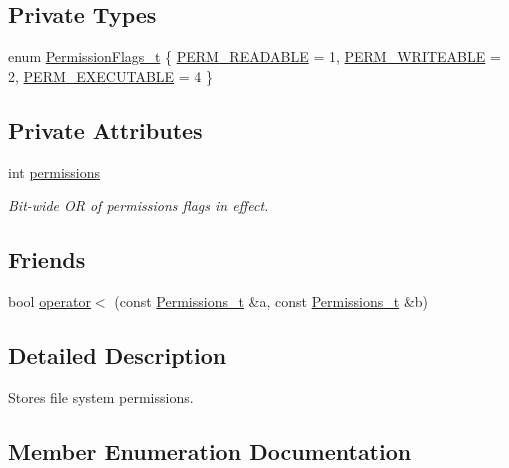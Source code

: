 \subsection*{Private Types}
\begin{DoxyCompactItemize}
\item 
enum \hyperlink{structmodel_1_1_permissions__t_ab1c91c7f3d56dced962efd5095d6bd49}{Permission\+Flags\+\_\+t} \{ \hyperlink{structmodel_1_1_permissions__t_ab1c91c7f3d56dced962efd5095d6bd49adae172fe253bba2932c2972b03c0bb81}{P\+E\+R\+M\+\_\+\+R\+E\+A\+D\+A\+B\+LE} = 1, 
\hyperlink{structmodel_1_1_permissions__t_ab1c91c7f3d56dced962efd5095d6bd49a2d1f75751b928036a9c12346d3b1b2a4}{P\+E\+R\+M\+\_\+\+W\+R\+I\+T\+E\+A\+B\+LE} = 2, 
\hyperlink{structmodel_1_1_permissions__t_ab1c91c7f3d56dced962efd5095d6bd49a3b1946495fe5bb5971e48bf2337774b1}{P\+E\+R\+M\+\_\+\+E\+X\+E\+C\+U\+T\+A\+B\+LE} = 4
 \}
\end{DoxyCompactItemize}
\subsection*{Private Attributes}
\begin{DoxyCompactItemize}
\item 
int \hyperlink{structmodel_1_1_permissions__t_a87e9da01b0af4afe2b2a0038b0ae6074}{permissions}
\begin{DoxyCompactList}\small\item\em Bit-\/wide OR of permissions flags in effect. \end{DoxyCompactList}\end{DoxyCompactItemize}
\subsection*{Friends}
\begin{DoxyCompactItemize}
\item 
bool \hyperlink{structmodel_1_1_permissions__t_a215e1c6bd16dc184cc10a24ca7d37a8d}{operator$<$} (const \hyperlink{structmodel_1_1_permissions__t}{Permissions\+\_\+t} \&a, const \hyperlink{structmodel_1_1_permissions__t}{Permissions\+\_\+t} \&b)
\end{DoxyCompactItemize}


\subsection{Detailed Description}
Stores file system permissions. 

\subsection{Member Enumeration Documentation}
